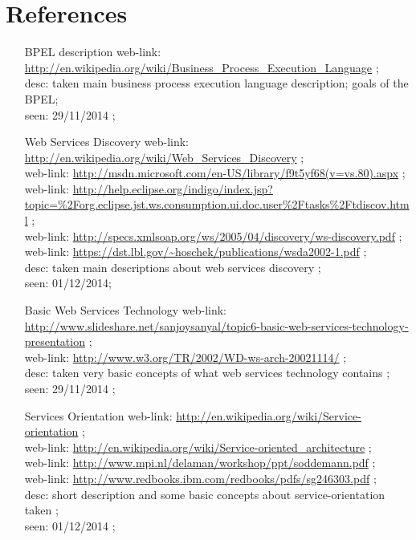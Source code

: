 \section{References}
\par{
\begin{enumerate}
\item [BPEL description] web-link: \url{http://en.wikipedia.org/wiki/Business_Process_Execution_Language} ; \\ desc: taken main business process execution language description; goals of the BPEL; \\ seen: 29/11/2014 ; \\ 
\item [Web Services Discovery] web-link: \url{http://en.wikipedia.org/wiki/Web_Services_Discovery} ; \\ 
web-link: \url{http://msdn.microsoft.com/en-US/library/f9t5yf68(v=vs.80).aspx} ; \\
web-link: \url{http://help.eclipse.org/indigo/index.jsp?topic=%2Forg.eclipse.jst.ws.consumption.ui.doc.user%2Ftasks%2Ftdiscov.html} ; \\ 
web-link: \url{http://specs.xmlsoap.org/ws/2005/04/discovery/ws-discovery.pdf} ; \\
web-link: \url{https://dst.lbl.gov/~hoschek/publications/wsda2002-1.pdf} ; \\
desc: taken main descriptions about web services discovery ; \\ seen: 01/12/2014; \\
\item [Basic Web Services Technology] web-link: \url{http://www.slideshare.net/sanjoysanyal/topic6-basic-web-services-technology-presentation} ; \\ 
web-link: \url{http://www.w3.org/TR/2002/WD-ws-arch-20021114/} ; \\ desc: taken very basic concepts of what web services technology contains ; \\ seen: 29/11/2014 ; \\
\item [Services Orientation] web-link: \url{http://en.wikipedia.org/wiki/Service-orientation} ; \\ 
web-link: \url{http://en.wikipedia.org/wiki/Service-oriented_architecture} ; \\ 
web-link: \url{http://www.mpi.nl/delaman/workshop/ppt/soddemann.pdf} ; \\ 
web-link: \url{http://www.redbooks.ibm.com/redbooks/pdfs/sg246303.pdf} ; \\ desc: short description and some basic concepts about service-orientation taken ; \\ seen: 01/12/2014 ; \\

\end{enumerate}}
